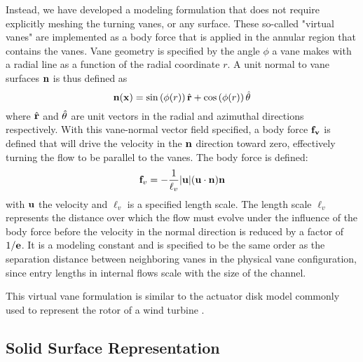 Instead, we have developed a modeling formulation that does not require
explicitly meshing the turning vanes, or any surface. These so-called
"virtual vanes" are implemented as a body force that 
is applied in the annular region that contains the vanes. Vane
geometry is specified by the angle $\phi$ a vane makes with a radial
line as a function of the radial coordinate $r$. A unit normal to vane
surfaces ${\bf n}$ is thus defined as
%
\begin{equation}
 {\bf n}({\bf x}) = \sin \left(\phi(r) \right) \hat{{\bf r}}+ \cos \left(\phi(r) \right) \hat{{\bf \theta}}
\end{equation}
%
where $\hat{{\bf r}}$ and $\hat{{\bf \theta}}$ are unit
vectors in the radial and azimuthal directions respectively.
With this vane-normal vector field specified, a body force ${\bf f_v}$
is defined
that will drive the velocity in the ${\bf n}$ direction toward zero,
effectively turning the flow to be parallel to the vanes. The body
force is defined:
\begin{equation}
 {\bf f}_v= -\frac{1}{\ell_v}|{\bf u}|({\bf u}\cdot{\bf n}){\bf n}
 \label{eqn:body_force}
\end{equation}
with ${\bf u}$ the velocity and $\ell_v$ is a specified length
scale. The length scale $\ell_v$ represents the distance over which the
flow must evolve under the influence of the body force before the
velocity in the normal direction is reduced by a factor of $1/{\bf
e}$. It is a modeling constant and is specified to be the same order as
the separation distance between neighboring vanes in the physical vane 
configuration, since entry lengths in internal flows scale with the
size of the channel.

This virtual vane formulation is similar to the actuator disk model
commonly used to represent the rotor of a wind turbine \cite{betz}.


\subsection{Solid Surface Representation}
\label{subsec:solid_surface}

